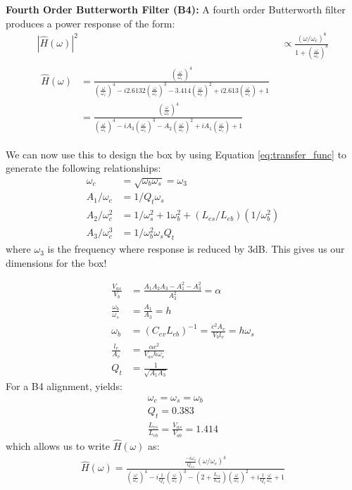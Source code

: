 \documentclass[10pt,letterpaper]{book}
\begin{document}
\textbf{Fourth Order Butterworth Filter (B4):} A fourth order Butterworth filter produces a power response of the form:
\begin{align}
\left|  \hat{H}(\omega) \right|^2&\propto \frac{(\omega/\omega_c)^8}{1+\left(\frac{\omega}{\omega_c}\right)^8}\label{eq:transfer_func}\\
\begin{split}
\hat{H}(\omega)&=\frac{(\frac{\omega}{\omega_c})^4}{(\frac{\omega}{\omega_c})^4-i2.6132(\frac{\omega}{\omega_c})^3-3.414(\frac{\omega}{\omega_c})^2+i2.613(\frac{\omega}{\omega_c})+1}\\
&=\frac{(\frac{\omega}{\omega_c})^4}{(\frac{\omega}{\omega_c})^4-iA_3(\frac{\omega}{\omega_c})^3-A_2(\frac{\omega}{\omega_c})^2+iA_1(\frac{\omega}{\omega_c})+1}
\end{split}
\end{align}

We can now use this to design the box by using Equation \ref{eq:transfer_func} to generate the following relationships:
\begin{align}
\omega_c&=\sqrt{\omega_b \omega_s}=\omega_3\\
A_1/\omega_c&=1/Q_t\omega_s\\
A_2/\omega_c^2&=1/\omega_s^2+1\omega_b^2+(L_{es}/L_{eb})(1/\omega_b^2)\\
A_3/\omega_c^3&=1/\omega_b^2\omega_sQ_t
\end{align}
where $\omega_3$ is the frequency where response is reduced by 3dB. This gives us our dimensions for the box!

\begin{align}
\frac{V_{as}}{V_{b}}&=\frac{A_1A_2A_3-A_1^2-A_3^2}{A_3^2}=\alpha\label{eq:dimensions-start}\\
\frac{\omega_b}{\omega_s}&=\frac{A_1}{A_3}=h\\
\omega_b&=(C_{ev}L_{eb})^{-1}=\frac{c^2A_v}{V_bl_v}=h\omega_s\\
\frac{l_v}{A_v}&=\frac{\alpha c^2}{V_{as} h \omega_s}\\
Q_t&=\frac{1}{\sqrt{A_1A_3}}\label{eq:dimensions-end}
\end{align}
For a B4 alignment, yields:
\begin{align}
\omega_c=\omega_s=\omega_b\\
Q_t=0.383\\
\frac{L_{es}}{L_{eb}}=\frac{V_{as}}{V_{ab}}=1.414
\end{align}
which allows us to write $\hat{H}(\omega)$ as:
\begin{align}
\hat{H}(\omega)=\frac{\frac{-i\omega_c}{Q_{es}}(\omega/\omega_c)^4}
{\left(\frac{\omega}{\omega_c}\right)^4-i\frac{1}{Q_t}\left(\frac{\omega}{\omega_c}\right)^3-\left(2+\frac{L_{es}}{L_{eb}}\right)\left(\frac{\omega}{\omega_c}\right)^2+i\frac{1}{Q_t}\frac{\omega}{\omega_c}+1}
\end{align}
\end{document}
